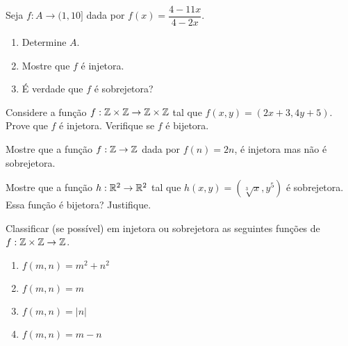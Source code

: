 \documentclass[12pt]{exam}
\begin{document}
    \vspace{.3cm}

    \questao{} Seja $f : A \to (1,10]$ dada por $f(x) = \dfrac{4 - 11x}{4 - 2x}$.
    \begin{enumerate}[label={\alph*})]
        \item Determine $A$.

        \item Mostre que $f$ é injetora.

        \item É verdade que $f$ é sobrejetora?
    \end{enumerate}

    \vspace{.3cm}

    \questao{} Considere a função $f : \mathbb{Z} \times \mathbb{Z} \to \mathbb{Z} \times \mathbb{Z}$ tal que $f(x,y) = (2x + 3, 4y + 5)$. Prove que $f$ é injetora. Verifique se $f$ é bijetora.

    \vspace{.3cm}

    \questao{} Mostre que a função $f : \mathbb{Z} \to \mathbb{Z}$ dada por $f(n) = 2n$, é injetora mas não é sobrejetora.

    \vspace{.3cm}

    \questao{} Mostre que a função $h : \mathbb{R}^2 \to \mathbb{R}^2$ tal que $h(x, y) = (\sqrt[3]{x}, y^5)$ é sobrejetora. Essa função é bijetora? Justifique.

    \vspace{.3cm}

    \questao{} Classificar (se possível) em injetora ou sobrejetora as seguintes funç{õ}es de $f : \mathbb{Z} \times \mathbb{Z} \to \mathbb{Z}$.

    \begin{multicols}{2}
        \begin{enumerate}[label={\alph*})]
            \item $f(m, n) = m^2 + n^2$

            \item $f(m, n) = m$

            \item $f(m, n) = |n|$

            \item $f(m, n) = m - n$
        \end{enumerate}
    \end{multicols}

    \vspace{.3cm}
\end{document}
